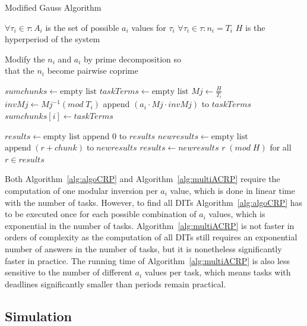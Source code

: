 \documentclass[conference]{IEEEtran}
\begin{document}
		\begin{algorithm}
			\caption{Modified Gauss Algorithm}
			\label{alg:multiACRP}
			\begin{algorithmic}[1]
				\REQUIRE $\forall \tau_i \in \tau: A_i$ is the set of possible $a_i$ values
				for $\tau_i$
				\REQUIRE $\forall \tau_i \in \tau : n_i = T_i$
				\REQUIRE $H$ is the hyperperiod of the system

				\STATE Modify the $n_i$ and $a_i$ by prime decomposition so \\ that the
				$n_i$ become pairwise coprime

				\STATE $sumchunks \leftarrow \text{empty list}$
					\STATE $taskTerms \leftarrow \text{empty list}$
					\STATE $Mj \leftarrow \frac{H}{T_i}$
					\STATE $invMj \leftarrow Mj^{-1} (mod \; T_i)$
						\STATE append $(a_i \cdot Mj \cdot invMj)$ to $taskTerms$
					\ENDFOR
					\STATE $sumchunks[i] \leftarrow taskTerms$
				\ENDFOR

				\STATE $results \leftarrow \text{empty list}$
				\STATE append $0$ to $results$
					\STATE $newresults \leftarrow \text{empty list}$
							\STATE $\text{append} \; (r + chunk) \; \text{to} \; newresults$
						\ENDFOR
					\ENDFOR
					\STATE $results \leftarrow newresults$
				\ENDFOR
				\RETURN $r \; (mod \; H)$ for all $r \in results$
			\end{algorithmic}
		\end{algorithm}

		Both Algorithm~\ref{alg:algoCRP} and Algorithm~\ref{alg:multiACRP} require the
		computation of one modular inversion per $a_i$ value, which is done in linear
		time with the number of tasks. However, to find all DITs
		Algorithm~\ref{alg:algoCRP} has to be executed once for each possible
		combination of $a_i$ values, which is exponential in the number of tasks.
		Algorithm~\ref{alg:multiACRP} is not faster in orders of
		complexity as the computation of all DITs still requires an exponential number
		of answers in the number of tasks, but it is nonetheless significantly faster
		in practice. The running time of Algorithm~\ref{alg:multiACRP} is also less
		sensitive to the number of different $a_i$ values per task, which means tasks
		with deadlines significantly smaller than periods remain practical.

	\subsection{Simulation}
	\label{sct:noFPDITsimu}
\end{document}
